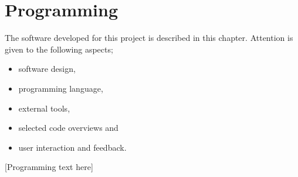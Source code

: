 \chapter{Programming}\label{chap:prog}
\begin{overview}
  The software developed for this project is described in this chapter.
  Attention is given to the following aspects;
  \begin{itemize}
    \item software design,
    \item programming language,
    \item external tools,
    \item selected code overviews and
    \item user interaction and feedback.
  \end{itemize}
\end{overview}

[Programming text here]